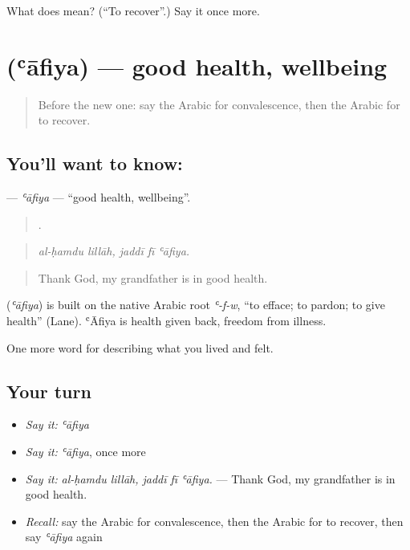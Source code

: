 \begin{tcolorbox}[breakable,colback=teal!4,colframe=teal!35!black,title={Before you move on}]
What does  mean? (\textquotedblleft{}To recover\textquotedblright{}.) Say it once more.
\end{tcolorbox}
\section[\texorpdfstring{\ar{عافية} (ʿāfiya)}{عافية (ʿāfiya)}]{ (ʿāfiya) — good health, wellbeing}

\label{lesson:AR-C512-afiya}



\begin{quote}
Before the new one: say the Arabic for convalescence, then the Arabic for to recover.
\end{quote}

\subsection*{You'll want to know: }
\textbf{} — \emph{ʿāfiya} — \textquotedblleft{}good health, wellbeing\textquotedblright{}.

\begin{quote}
    .
\end{quote}

\begin{quote}
\emph{al-ḥamdu lillāh, jaddī fī ʿāfiya.}
\end{quote}

\begin{quote}
Thank God, my grandfather is in good health.
\end{quote}

\begin{cousinweb}
\textbf{} (\emph{ʿāfiya}) is built on the native Arabic root \emph{ʿ-f-w}, \textquotedblleft{}to efface; to pardon; to give health\textquotedblright{} (Lane). ʿĀfiya is health given back, freedom from illness.
\end{cousinweb}

\begin{grammarlens}[title={What you've built}]
One more word for describing what you lived and felt.
\end{grammarlens}

\subsection*{Your turn}
\begin{itemize}
\raggedright
  \item \emph{Say it:} \emph{ʿāfiya}
  \item \emph{Say it:} \emph{ʿāfiya}, once more
  \item \emph{Say it:} \emph{al-ḥamdu lillāh, jaddī fī ʿāfiya.} — Thank God, my grandfather is in good health.
  \item \emph{Recall:} say the Arabic for convalescence, then the Arabic for to recover, then say \emph{ʿāfiya} again
\end{itemize}

